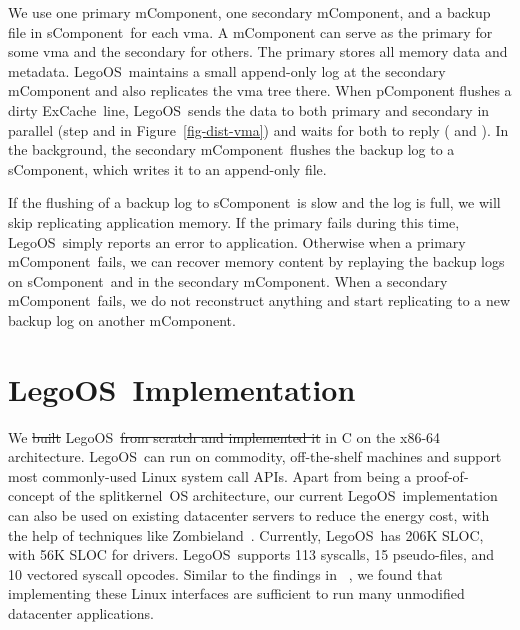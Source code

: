 \documentclass[10pt,times,twocolumn]{z2-article}
\newcommand*\circled[1]{\tikz[baseline=-3pt]{
            \node[shape=circle,draw,inner sep=1pt,minimum size=10pt] (char) {\small #1};}}
\newcommand{\splitkernel}{splitkernel}
\newcommand{\lego}{LegoOS}
\newcommand{\excache}{ExCache}
\newcommand{\pcomponent}{pComponent}
\newcommand{\mcomponent}{mComponent}
\newcommand{\scomponent}{sComponent}
\providecommand{\DIFaddtex}[1]{{\protect\color{blue}\uwave{#1}}} %
\providecommand{\DIFdeltex}[1]{{\protect\color{red}\sout{#1}}}                      %
\providecommand{\DIFaddbegin}{} %
\providecommand{\DIFaddend}{} %
\providecommand{\DIFdelbegin}{} %
\providecommand{\DIFdelend}{} %
\providecommand{\DIFadd}[1]{\texorpdfstring{\DIFaddtex{#1}}{#1}} %
\providecommand{\DIFdel}[1]{\texorpdfstring{\DIFdeltex{#1}}{}} %
\newcommand{\DIFscaledelfig}{0.5}
\newlength{\DIFdelgraphicswidth} %
\newlength{\DIFdelgraphicsheight} %
\newcommand{\DIFaddincludegraphics}[2][]{{\color{blue}\fbox{\DIFOincludegraphics[#1]{#2}}}} %
\newcommand{\DIFdelincludegraphics}[2][]{%
\sbox{\DIFdelgraphicsbox}{\DIFOincludegraphics[#1]{#2}}%
\settoboxwidth{\DIFdelgraphicswidth}{\DIFdelgraphicsbox} %
\settoboxtotalheight{\DIFdelgraphicsheight}{\DIFdelgraphicsbox} %
\scalebox{\DIFscaledelfig}{%
\parbox[b]{\DIFdelgraphicswidth}{\usebox{\DIFdelgraphicsbox}\\[-\baselineskip] \rule{\DIFdelgraphicswidth}{0em}}\llap{\resizebox{\DIFdelgraphicswidth}{\DIFdelgraphicsheight}{%
\setlength{\unitlength}{\DIFdelgraphicswidth}%
\begin{picture}(1,1)%
\thicklines\linethickness{2pt} %
{\color[rgb]{1,0,0}\put(0,0){\framebox(1,1){}}}%
{\color[rgb]{1,0,0}\put(0,0){\line( 1,1){1}}}%
{\color[rgb]{1,0,0}\put(0,1){\line(1,-1){1}}}%
\end{picture}%
}\hspace*{3pt}}} %
} %
\DeclareRobustCommand{\DIFaddbegin}{\DIFOaddbegin \let\includegraphics\DIFaddincludegraphics} %
\DeclareRobustCommand{\DIFaddend}{\DIFOaddend \let\includegraphics\DIFOincludegraphics} %
\DeclareRobustCommand{\DIFdelbegin}{\DIFOdelbegin \let\includegraphics\DIFdelincludegraphics} %
\DeclareRobustCommand{\DIFdelend}{\DIFOaddend \let\includegraphics\DIFOincludegraphics} %
\begin{document}
{{{{{{{We use one primary \mcomponent, one secondary \mcomponent, and a backup file in \scomponent\ for each vma.
A \mcomponent{} can serve as the primary for some vma and the secondary for others.
The primary stores all memory data and metadata. %
\lego\ maintains a small append-only log at the secondary \mcomponent{}
and also replicates the vma tree there.
When \pcomponent{} flushes a dirty \excache\ line, 
\lego\ sends the data to both primary and secondary in parallel (step \circled{a} and \circled{b} in Figure~\ref{fig-dist-vma})
and waits for both to reply (\circled{c} and \circled{d}).
In the background, the secondary \mcomponent\ flushes the backup log to a \scomponent{},
which writes it to an append-only file.

If the flushing of a backup log to \scomponent\ is slow and the log is full, 
we will skip replicating application memory.
If the primary fails during this time, \lego\ simply reports an error to application.
Otherwise when a primary \mcomponent\ fails, we can recover memory content 
by replaying the backup logs on \scomponent\ and in the secondary \mcomponent.
When a secondary \mcomponent\ fails, we do not reconstruct anything 
and start replicating to a new backup log on another \mcomponent{}.

\section{\lego\ Implementation}
\label{sec:impl}

We \DIFdelbegin \DIFdel{built }\DIFdelend \DIFaddbegin \DIFadd{implemented }\DIFaddend \lego\ \DIFdelbegin \DIFdel{from scratch
and implemented it }\DIFdelend in C on the x86-64 architecture.
\lego\ can run on commodity, off-the-shelf machines 
and support most commonly-used Linux system call APIs.
Apart from being a proof-of-concept of the \splitkernel\ OS architecture,
our current \lego\ implementation can also be used on existing datacenter servers to reduce the energy cost,
with the help of techniques like Zombieland~\cite{Nitu18-EUROSYS}.
Currently, \lego\ has 206K SLOC,
with 56K SLOC for drivers.
\lego\ supports 113 syscalls, 15 pseudo-files,
and 10 vectored syscall opcodes. 
Similar to the findings in ~\cite{tsai-eurosys16}, we found that implementing these Linux interfaces
are sufficient to run many unmodified datacenter applications.

\DIFdelbegin %

}}}}}}}
\end{document}
